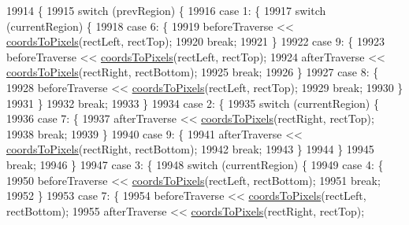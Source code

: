 \begin{DoxyCode}
19914                                                                               \{
19915   \textcolor{keywordflow}{switch} (prevRegion) \{
19916   \textcolor{keywordflow}{case} 1: \{
19917     \textcolor{keywordflow}{switch} (currentRegion) \{
19918     \textcolor{keywordflow}{case} 6: \{
19919       beforeTraverse << \hyperlink{class_q_c_p_abstract_plottable_ade710a776104b14c1c835168ce1bfc5c}{coordsToPixels}(rectLeft, rectTop);
19920       \textcolor{keywordflow}{break};
19921     \}
19922     \textcolor{keywordflow}{case} 9: \{
19923       beforeTraverse << \hyperlink{class_q_c_p_abstract_plottable_ade710a776104b14c1c835168ce1bfc5c}{coordsToPixels}(rectLeft, rectTop);
19924       afterTraverse << \hyperlink{class_q_c_p_abstract_plottable_ade710a776104b14c1c835168ce1bfc5c}{coordsToPixels}(rectRight, rectBottom);
19925       \textcolor{keywordflow}{break};
19926     \}
19927     \textcolor{keywordflow}{case} 8: \{
19928       beforeTraverse << \hyperlink{class_q_c_p_abstract_plottable_ade710a776104b14c1c835168ce1bfc5c}{coordsToPixels}(rectLeft, rectTop);
19929       \textcolor{keywordflow}{break};
19930     \}
19931     \}
19932     \textcolor{keywordflow}{break};
19933   \}
19934   \textcolor{keywordflow}{case} 2: \{
19935     \textcolor{keywordflow}{switch} (currentRegion) \{
19936     \textcolor{keywordflow}{case} 7: \{
19937       afterTraverse << \hyperlink{class_q_c_p_abstract_plottable_ade710a776104b14c1c835168ce1bfc5c}{coordsToPixels}(rectRight, rectTop);
19938       \textcolor{keywordflow}{break};
19939     \}
19940     \textcolor{keywordflow}{case} 9: \{
19941       afterTraverse << \hyperlink{class_q_c_p_abstract_plottable_ade710a776104b14c1c835168ce1bfc5c}{coordsToPixels}(rectRight, rectBottom);
19942       \textcolor{keywordflow}{break};
19943     \}
19944     \}
19945     \textcolor{keywordflow}{break};
19946   \}
19947   \textcolor{keywordflow}{case} 3: \{
19948     \textcolor{keywordflow}{switch} (currentRegion) \{
19949     \textcolor{keywordflow}{case} 4: \{
19950       beforeTraverse << \hyperlink{class_q_c_p_abstract_plottable_ade710a776104b14c1c835168ce1bfc5c}{coordsToPixels}(rectLeft, rectBottom);
19951       \textcolor{keywordflow}{break};
19952     \}
19953     \textcolor{keywordflow}{case} 7: \{
19954       beforeTraverse << \hyperlink{class_q_c_p_abstract_plottable_ade710a776104b14c1c835168ce1bfc5c}{coordsToPixels}(rectLeft, rectBottom);
19955       afterTraverse << \hyperlink{class_q_c_p_abstract_plottable_ade710a776104b14c1c835168ce1bfc5c}{coordsToPixels}(rectRight, rectTop);

\end{DoxyCode}
